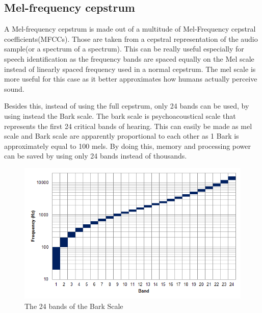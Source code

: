 
\subsection{Mel-frequency cepstrum}
A Mel-frequency cepstrum is made out of a multitude of Mel-Frequency cepstral coefficients(MFCCs). Those are taken from a cepstral representation of the audio sample(or a spectrum of a spectrum).
This can be really useful especially for speech identification as the frequency bands are spaced equally on the Mel scale instead of linearly spaced frequency used in a normal cepstrum. The mel scale is more useful for this case as it better approximates how humans actually perceive sound.


Besides this, instead of using the full cepstrum, only 24 bands can be used, by using instead the Bark scale.
The bark scale is psychoacoustical scale that represents the first 24 critical bands of hearing. This can easily be made as mel scale and Bark scale are apparently proportional to each other as 1 Bark is approximately equal to 100 mels.
By doing this, memory and processing power can be saved by using only 24 bands instead of thousands.
\begin{figure}[htp]
	\centering
	\includegraphics[width=1\textwidth]{Illustrations/Bark_scale.png}
	\caption{The 24 bands of the Bark Scale}
	\label{fig:BarkScale}
\end{figure}
\newpage
